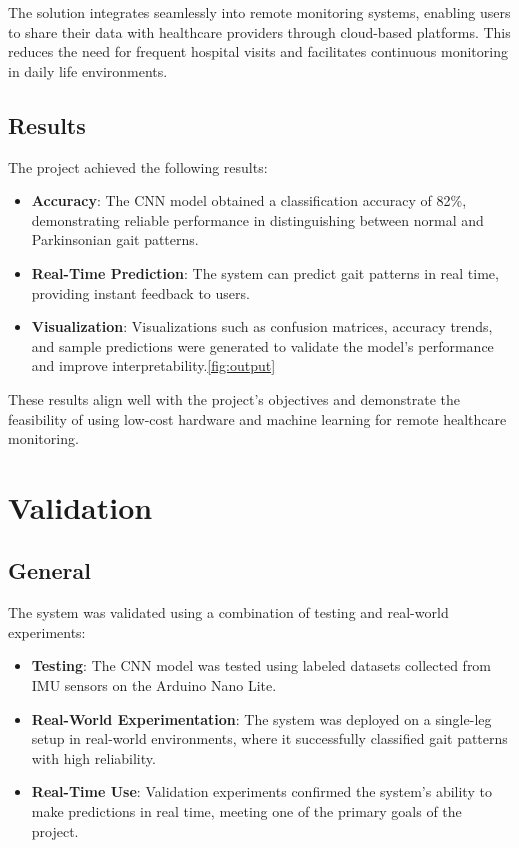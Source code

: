 The solution integrates seamlessly into remote monitoring systems, enabling users to share their data with healthcare providers through cloud-based platforms. This reduces the need for frequent hospital visits and facilitates continuous monitoring in daily life environments.

\subsection{Results}
The project achieved the following results:
\begin{itemize}
	\item \textbf{Accuracy}: The CNN model obtained a classification accuracy of 82\%, demonstrating reliable performance in distinguishing between normal and Parkinsonian gait patterns.
	\item \textbf{Real-Time Prediction}: The system can predict gait patterns in real time, providing instant feedback to users.
	\item \textbf{Visualization}: Visualizations such as confusion matrices, accuracy trends, and sample predictions were generated to validate the model’s performance and improve interpretability.\ref{fig:output}
\end{itemize}

These results align well with the project’s objectives and demonstrate the feasibility of using low-cost hardware and machine learning for remote healthcare monitoring.

\section{Validation}

\subsection{General}
The system was validated using a combination of testing and real-world experiments:
\begin{itemize}
	\item \textbf{Testing}: The CNN model was tested using labeled datasets collected from IMU sensors on the Arduino Nano Lite.
	\item \textbf{Real-World Experimentation}: The system was deployed on a single-leg setup in real-world environments, where it successfully classified gait patterns with high reliability.
	\item \textbf{Real-Time Use}: Validation experiments confirmed the system’s ability to make predictions in real time, meeting one of the primary goals of the project.
\end{itemize}

